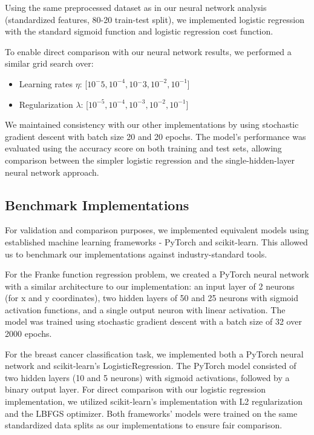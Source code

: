 Using the same preprocessed dataset as in our neural network analysis (standardized features, 80-20 train-test split), we implemented logistic regression with the standard sigmoid function and logistic regression cost function.

To enable direct comparison with our neural network results, we performed a similar grid search over:

\begin{itemize}
    \item Learning rates \( \eta \): [\( 10^-{5,} 10^{-4}, 10{^-}3, 10^{-2}, 10^{-1} \)]
    \item Regularization \( \lambda \): [\( 10^{-5}, 10^{-4}, 10^{-3}, 10^{-2}, 10^{-1} \)]
\end{itemize}
We maintained consistency with our other implementations by using stochastic gradient descent with batch size 20 and 20 epochs. The model's performance was evaluated using the accuracy score on both training and test sets, allowing comparison between the simpler logistic regression and the single-hidden-layer neural network approach.

\subsection{Benchmark Implementations}
For validation and comparison purposes, we implemented equivalent models using established machine learning frameworks - PyTorch\cite{PyTorch} and scikit-learn\cite{scikit-learn}. This allowed us to benchmark our implementations against industry-standard tools.

For the Franke function regression problem, we created a PyTorch neural network with a similar architecture to our implementation: an input layer of 2 neurons (for x and y coordinates), two hidden layers of 50 and 25 neurons with sigmoid activation functions, and a single output neuron with linear activation. The model was trained using stochastic gradient descent with a batch size of 32 over 2000 epochs.

For the breast cancer classification task, we implemented both a PyTorch neural network and scikit-learn's LogisticRegression. The PyTorch model consisted of two hidden layers (10 and 5 neurons) with sigmoid activations, followed by a binary output layer. For direct comparison with our logistic regression implementation, we utilized scikit-learn's implementation with L2 regularization and the LBFGS optimizer. Both frameworks' models were trained on the same standardized data splits as our implementations to ensure fair comparison.

